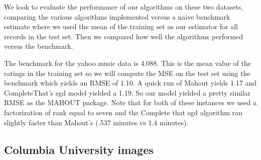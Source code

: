 \documentclass[12pt]{article}
\begin{document}
We look to evaluate the performance of our algorithms on these two datasets, comparing the various algorithms implemented versus a naive benchmark estimate where we used the mean of the training set as our estimator for all records in the test set. Then we compared how well the algorithms performed versus the benchmark. 

The benchmark for the yahoo music data is 4.088. This is the mean value of the ratings in the training set so we will compute the MSE on the test set using the benchmark which yields an RMSE of 1.10. A quick run of Mahout yields 1.17 and CompleteThat's sgd model yielded a 1.19. So our model yielded a pretty similar RMSE as the MAHOUT package. Note that for both of these instances we used a factorization of rank equal to seven and the Complete that sgd algorithm ran slightly faster than Mahout's (.537 minutes vs 1.4 minutes). 

\begin{table}[h]
\centering
{}
\caption{RMSE vs Step Size vs Rank}
\end{table}

\subsection*{Columbia University images}
\end{document}
